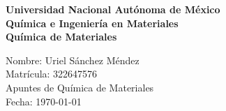 \documentclass[12pt]{article}
\renewcommand{\headrulewidth}{0pt}
\newcommand{\activarEncabezado}[1]{%
  \fancyhead[L]{\small\textcolor{blueunam}{#1}}%
  \fancyhead[R]{\small\textcolor{blueunam}{\nouppercase{\leftmark}}}%
  \renewcommand{\headrulewidth}{0.4pt}%
  \renewcommand{\headrule}{\hbox to\headwidth{\color{blueunam}\leaders\hrule height \headrulewidth\hfill}}%
}
\begin{document}
\begin{titlepage}
\thispagestyle{empty}
\begin{center}
\vspace*{2cm}
\fontsize{14}{30}\selectfont\textbf{Universidad Nacional Autónoma de México} \\
\vspace{1cm}
\fontsize{14}{30}\selectfont\textbf{Química e Ingeniería en Materiales} \\
\vspace{1cm}
\fontsize{14}{30}\selectfont\textbf{Química de Materiales} \\
\end{center}
\vspace{2cm}
\begin{flushright}
    \fontsize{14}{30}\selectfont
        \hspace{2cm} Nombre: Uriel Sánchez Méndez \\
        \hspace{2cm} Matrícula: 322647576 \\
        \hspace{2cm} Apuntes de Química de Materiales \\
        \hspace{2cm} Fecha: \today \\
\end{flushright}
\end{titlepage}

\tableofcontents
\thispagestyle{empty}
\newpage











\end{document}

